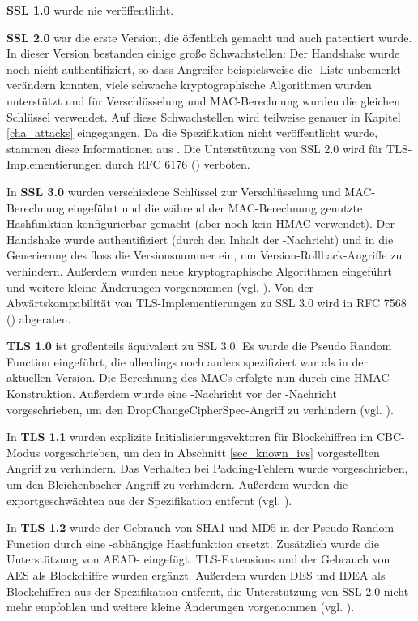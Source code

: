 \textbf{SSL 1.0} wurde nie veröffentlicht.

\textbf{SSL 2.0} war die erste Version, die öffentlich gemacht und auch patentiert wurde. In dieser Version bestanden einige große Schwachstellen: Der Handshake wurde noch nicht authentifiziert, so dass Angreifer beispielsweise die \ciphersuite-Liste unbemerkt verändern konnten, viele schwache kryptographische Algorithmen wurden unterstützt und für Verschlüsselung und MAC-Berechnung wurden die gleichen Schlüssel verwendet. Auf diese Schwachstellen wird teilweise genauer in Kapitel \ref{cha_attacks} eingegangen. Da die Spezifikation nicht veröffentlicht wurde, stammen diese Informationen aus \cite{meyer14}. Die Unterstützung von SSL 2.0 wird für TLS-Implementierungen durch RFC 6176 (\cite{prohibit_ssl20}) verboten.

In \textbf{SSL 3.0} wurden verschiedene Schlüssel zur Verschlüsselung und MAC-Berechnung eingeführt und die während der MAC-Berechnung genutzte Hashfunktion konfigurierbar gemacht (aber noch kein HMAC verwendet). Der Handshake wurde authentifiziert (durch den Inhalt der \finished{}-Nachricht) und in die Generierung des \premastersecret{} floss die Versionsnummer ein, um Version-Rollback-Angriffe zu verhindern. Außerdem wurden neue kryptographische Algorithmen eingeführt und weitere kleine Änderungen vorgenommen (vgl. \cite{ssl30}). Von der Abwärtskompabilität von TLS-Implementierungen zu SSL 3.0 wird in RFC 7568 (\cite{deprecate_ssl30}) abgeraten.

\textbf{TLS 1.0} ist großenteils äquivalent zu SSL 3.0. Es wurde die Pseudo Random Function eingeführt, die allerdings noch anders spezifiziert war als in der aktuellen Version. Die Berechnung des MACs erfolgte nun durch eine HMAC-Konstruktion. Außerdem wurde eine \changecipherspec{}-Nachricht vor der \finished{}-Nachricht vorgeschrieben, um den DropChangeCipherSpec-Angriff zu verhindern (vgl. \cite{tls10}).

In \textbf{TLS 1.1} wurden explizite Initialisierungsvektoren für Blockchiffren im CBC-Modus vorgeschrieben, um den in Abschnitt \ref{sec_known_ivs} vorgestellten Angriff zu verhindern. Das Verhalten bei Padding-Fehlern wurde vorgeschrieben, um den Bleichenbacher-Angriff zu verhindern. Außerdem wurden die exportgeschwächten \ciphersuites{} aus der Spezifikation entfernt (vgl. \cite{tls11}).

In \textbf{TLS 1.2} wurde der Gebrauch von SHA1 und MD5 in der Pseudo Random Function durch eine \ciphersuite{}-abhängige Hashfunktion ersetzt. Zusätzlich wurde die Unterstützung von AEAD-\ciphersuites{} eingefügt. TLS-Extensions und der Gebrauch von AES als Blockchiffre wurden ergänzt. Außerdem wurden DES und IDEA als Blockchiffren aus der Spezifikation entfernt, die Unterstützung von SSL 2.0 nicht mehr empfohlen und weitere kleine Änderungen vorgenommen (vgl. \cite{tls12}).

